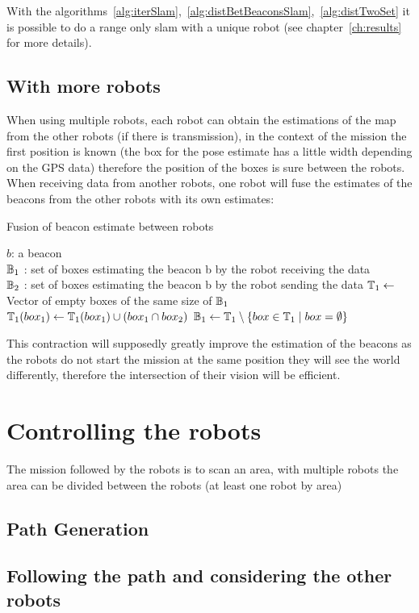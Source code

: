 With the algorithms~\ref{alg:iterSlam},~\ref{alg:distBetBeaconsSlam},~\ref{alg:distTwoSet} it is possible to do a range only slam with a unique robot (see chapter~\ref{ch:results} for more details).

\subsection{With more robots}

When using multiple robots, each robot can obtain the estimations of the map from the other robots (if there is transmission), in the context of the mission the first position is known (the box for the pose estimate has a little width depending on the GPS data) therefore the position of the boxes is sure between the robots. When receiving data from another robots, one robot will fuse the estimates of the beacons from the other robots with its own estimates:

\begin{algorithm}[H]
\caption{Fusion of beacon estimate between robots}
\label{alg:fuseDataRobotSet}
\begin{algorithmic}[1]
\REQUIRE $b$: a beacon\\
   $\mathbb{B_{\textnormal{1}}}$ : set of boxes estimating the beacon b by the robot receiving the data\\
   $\mathbb{B_{\textnormal{2}}}$ : set of boxes estimating the beacon b by the robot sending the data
\STATE $\mathbb{T_{\textnormal{1}}} \leftarrow$ Vector of empty boxes of the same size of $\mathbb{B_{\textnormal{1}}}$
\STATE $\mathbb{T_{\textnormal{1}}}(box_1) \leftarrow  \mathbb{T_{\textnormal{1}}}(box_1)  \cup (box_{1} \cap box_{2})$
\ENDFOR
\ENDFOR
\STATE $\mathbb{B_{\textnormal{1}}} \leftarrow \mathbb{T_{\textnormal{1}}}\setminus\{box \in \mathbb{T_{\textnormal{1}}} \mid box = \emptyset \}$
\end{algorithmic}
\end{algorithm}

This contraction will supposedly greatly improve the estimation of the beacons as the robots do not start the mission at the same position they will see the world differently, therefore the intersection of their vision will be efficient.

\section{Controlling the robots}

The mission followed by the robots is to scan an area, with multiple robots the area can be divided between the robots (at least one robot by area)
\subsection{Path Generation}

\subsection{Following the path and considering the other robots}